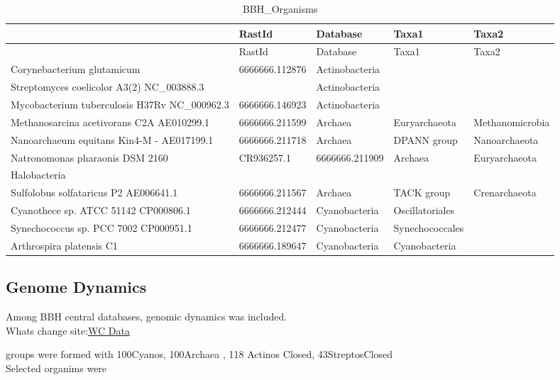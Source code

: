 \documentclass[12pt,twoside]{reedthesis}
\begin{document}
  \begin{longtable}[]{@{}lllll@{}}
  \caption{BBH\_Organisms \label{tab:BBH_Organisms}}\tabularnewline
  \toprule
  & RastId & Database & Taxa1 & Taxa2\tabularnewline
  \midrule
  \endfirsthead
  \toprule
  & RastId & Database & Taxa1 & Taxa2\tabularnewline
  \midrule
  \endhead
  Corynebacterium glutamicum & 6666666.112876 & Actinobacteria &
  &\tabularnewline
  Streptomyces coelicolor A3(2) NC\_003888.3 & & Actinobacteria &
  &\tabularnewline
  Mycobacterium tuberculosis H37Rv NC\_000962.3 & 6666666.146923 &
  Actinobacteria & &\tabularnewline
  Methanosarcina acetivorans C2A AE010299.1 & 6666666.211599 & Archaea &
  Euryarchaeota & Methanomicrobia\tabularnewline
  Nanoarchaeum equitans Kin4-M - AE017199.1 & 6666666.211718 & Archaea &
  DPANN group & Nanoarchaeota\tabularnewline
  Natronomonas pharaonis DSM 2160 & CR936257.1 & 6666666.211909 & Archaea
  & Euryarchaeota\tabularnewline
  Halobacteria & & & &\tabularnewline
  Sulfolobus solfataricus P2 AE006641.1 & 6666666.211567 & Archaea & TACK
  group & Crenarchaeota\tabularnewline
  Cyanothece sp. ATCC 51142 CP000806.1 & 6666666.212444 & Cyanobacteria &
  Oscillatoriales &\tabularnewline
  Synechococcus sp. PCC 7002 CP000951.1 & 6666666.212477 & Cyanobacteria &
  Synechococcales &\tabularnewline
  Arthrospira platensis C1 & 6666666.189647 & Cyanobacteria &
  Cyanobacteria &\tabularnewline
  \bottomrule
  \end{longtable}
  
  \subsection{Genome Dynamics}\label{genome-dynamics}
  
  Among BBH central databases, genomic dynamics was included.\\
  Whats change
  site:\href{http://pubseed.theseed.org/wc.cgi?request=show_otus\&base=/homes/nselem/Data/CS}{WC
  Data}
  
  groups were formed with 100Cyanos, 100Archaea , 118 Actinos Closed,
  43StreptosClosed\\
  Selected organims were
  
  \begin{Shaded}
  \begin{Highlighting}[]
  \StringTok{ }\NormalTok{(}\NormalTok{, } \NormalTok{,}\NormalTok{)}
   \CharTok{\textbackslash{}\textbackslash{}}\NormalTok{,} \NormalTok{)}
  \end{Highlighting}
  \end{Shaded}
  
\end{document}

